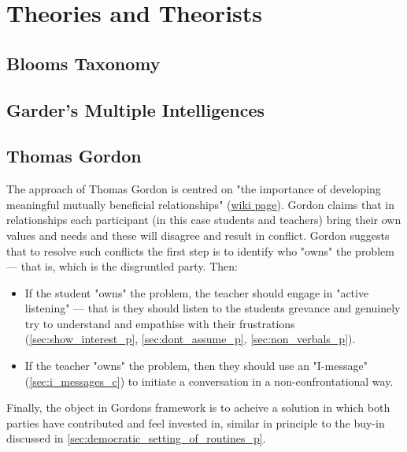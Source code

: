 \documentclass[12pt]{report}
\begin{document}
\chapter{Theories and Theorists}
\label{chap:theories}


\section{Blooms Taxonomy}
\label{sec:blooms_taxonomy}




\section{Garder's Multiple Intelligences}
\label{sec:gardner_theory}



\section{Thomas Gordon}
\label{sec:gordon_theory}

The approach of Thomas Gordon is centred on "the importance of developing meaningful mutually beneficial relationships" (\href{https://en.wikibooks.org/wiki/Classroom_Management_Theorists_and_Theories/Thomas_Gordon}{wiki page}). Gordon claims that in relationships each participant (in this case students and teachers) bring their own values and needs and these will disagree and result in conflict. Gordon suggests that to resolve such conflicts the first step is to identify who "owns" the problem --- that is, which is the disgruntled party. Then:
\begin{itemize}
  \item If the student "owns" the problem, the teacher should engage in "active listening" --- that is they should listen to the students grevance and genuinely try to understand and empathise with their frustrations (\ref{sec:show_interest_p}, \ref{sec:dont_assume_p}, \ref{sec:non_verbals_p}).
  \item If the teacher "owns" the problem, then they should use an "I-message" (\ref{sec:i_messages_c}) to initiate a conversation in a non-confrontational way.
\end{itemize}
Finally, the object in Gordons framework is to acheive a solution in which both parties have contributed and feel invested in, similar in principle to the buy-in discussed in \ref{sec:democratic_setting_of_routines_p}.
\end{document}
